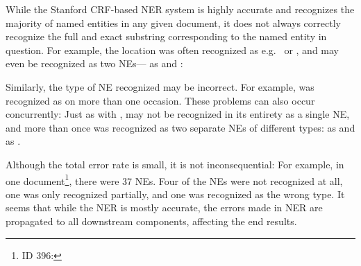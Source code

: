 While the Stanford CRF-based NER system is highly accurate and recognizes the majority of named entities in any given document, it does not always correctly recognize the full and exact substring corresponding to the named entity in question. For example, the location  was often recognized as e.g.\   or , and may even be recognized as two NEs--- as  and :



Similarly, the type of NE recognized may be incorrect. For example,  was recognized as  on more than one occasion. These problems can also occur concurrently: Just as with ,  may not be recognized in its entirety as a single NE, and more than once was recognized as two separate NEs of different types:  as  and  as .

Although the total error rate is small, it is not inconsequential: For example, in one document\footnote{ID 396: }, there were 37 NEs. Four of the NEs were not recognized at all, one was only recognized partially, and one was recognized as the wrong type. It seems that while the NER is mostly accurate, the errors made in NER are propagated to all downstream components, affecting the end results.
